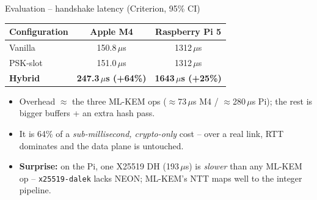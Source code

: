 \documentclass[aspectratio=169,11pt]{beamer}
\begin{document}
\begin{frame}{Evaluation -- handshake latency (Criterion, 95\% CI)}
  \begin{table}
    \centering\small
    \begin{tabular}{@{}lcc@{}}
      \toprule
      \textbf{Configuration} & \textbf{Apple M4} & \textbf{Raspberry Pi 5} \\
      \midrule
      Vanilla   & 150.8\,$\mu$s & 1312\,$\mu$s \\
      PSK-slot  & 151.0\,$\mu$s & 1312\,$\mu$s \\
      \textbf{Hybrid} & \textbf{247.3\,$\mu$s (+64\%)} & \textbf{1643\,$\mu$s (+25\%)} \\
      \bottomrule
    \end{tabular}
  \end{table}
  \vfill
  \begin{itemize}\small
    \item Overhead $\approx$ the three ML-KEM ops ($\approx$73\,$\mu$s M4 /
          $\approx$280\,$\mu$s Pi); the rest is bigger buffers + an extra hash pass.
    \item \alert{It is 64\% of a \emph{sub-millisecond, crypto-only} cost} --
          over a real link, RTT dominates and the data plane is untouched.
    \item \textbf{Surprise:} on the Pi, one X25519 DH (193\,$\mu$s) is
          \emph{slower} than any ML-KEM op -- \texttt{x25519-dalek} lacks NEON;
          ML-KEM's NTT maps well to the integer pipeline.
  \end{itemize}
\end{frame}
\end{document}
